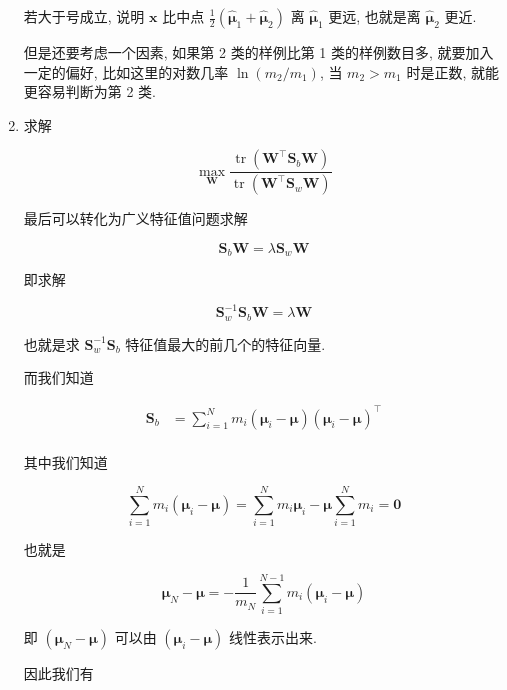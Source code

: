 \documentclass[answers]{exam}  %
\begin{document}
\begin{questions}
\begin{solution}
\begin{enumerate}
            若大于号成立, 说明 $\bm{x}$ 比中点 $\displaystyle \frac{1}{2}(\hat{\bm{\mu}}_{1}+\hat{\bm{\mu}}_{2})$ 离 $\hat{\bm{\mu}}_{1}$ 更远, 也就是离 $\hat{\bm{\mu}}_{2}$ 更近.

            但是还要考虑一个因素, 如果第 2 类的样例比第 1 类的样例数目多, 就要加入一定的偏好, 比如这里的对数几率 $\ln (m_2 / m_1)$, 当 $m_2 > m_1$ 时是正数, 就能更容易判断为第 2 类.

      \item

            求解

            $$
              \max_{\bm{W}} \frac{\operatorname{tr}(\bm{W}^{\top}\bm{S}_{b}\bm{W})}{\operatorname{tr}(\bm{W}^{\top}\bm{S}_{w}\bm{W})}
            $$

            最后可以转化为广义特征值问题求解

            $$
              \bm{S}_{b}\bm{W} = \lambda \bm{S}_{w}\bm{W}
            $$

            即求解

            $$
              \bm{S}_{w}^{-1}\bm{S}_{b}\bm{W} = \lambda \bm{W}
            $$

            也就是求 $\bm{S}_{w}^{-1}\bm{S}_{b}$ 特征值最大的前几个的特征向量.

            而我们知道

            $$
              \begin{aligned}
                \bm{S}_{b}
                 & = \sum_{i=1}^{N} m_{i}(\bm{\mu}_{i}-\bm{\mu})(\bm{\mu}_{i}-\bm{\mu})^{\top} \\
              \end{aligned}
            $$

            其中我们知道

            $$
              \sum_{i=1}^{N} m_i(\bm{\mu}_{i}-\bm{\mu}) = \sum_{i=1}^{N} m_i\bm{\mu}_{i}-\bm{\mu}\sum_{i=1}^{N}m_{i} = \bm{0}
            $$

            也就是

            $$
              \bm{\mu}_{N} - \bm{\mu} = -\frac{1}{m_{N}}\sum_{i=1}^{N-1}m_i(\bm{\mu}_{i}-\bm{\mu})
            $$

            即 $(\bm{\mu}_{N} - \bm{\mu})$ 可以由 $(\bm{\mu}_{i} - \bm{\mu})$ 线性表示出来.

            因此我们有


\end{enumerate}
\end{solution}
\end{questions}
\end{document}

